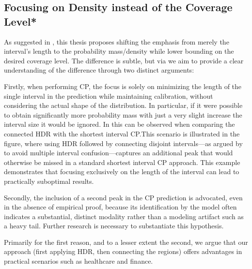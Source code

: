 \subsection{Focusing on Density instead of the Coverage Level*}\label{sec:density_focus}

As suggested in , this thesis proposes shifting the emphasis from merely the interval's length to the probability mass/density while lower bounding on the desired coverage level. The difference is subtle, but via  we aim to provide a clear understanding of the difference through two distinct arguments:

Firstly, when performing CP, the focus is solely on minimizing the length of the single interval in the prediction while maintaining calibration, without considering the actual shape of the distribution. In particular, if it were possible to obtain significantly more probability mass with just a very slight increase the interval size it would be ignored. In  this can be observed when comparing the connected HDR with the shortest interval CP.\@ This scenario is illustrated in the figure, where using HDR followed by connecting disjoint intervals—as argued by~\cite{sesia2021conformal} to avoid multiple interval confusion—captures an additional peak that would otherwise be missed in a standard shortest interval CP approach. This example demonstrates that focusing exclusively on the length of the interval can lead to practically suboptimal results.

Secondly, the inclusion of a second peak in the CP prediction is advocated, even in the absence of empirical proof, because its identification by the model often indicates a substantial, distinct modality rather than a modeling artifact such as a heavy tail. Further research is necessary to substantiate this hypothesis.

Primarily for the first reason, and to a lesser extent the second, we argue that our approach (first applying HDR, then connecting the regions) offers advantages in practical scenarios such as healthcare and finance.

